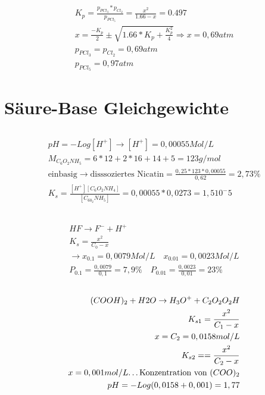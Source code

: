 \documentclass[a4paper]{article}
\begin{document}
\subsection{}
\begin{align}
  K_p = \frac{p_{PCl_3}*p_{Cl_2}}{p_{PCl_5}}=\frac{x^2}{1.66-x}=0.497\\
  x=\frac{-K_p}{2} \pm \sqrt{1.66*K_p+\frac{K_p^2}{4}} \Rightarrow x=0,69 atm\\
  p_{PCl_3} = p_{Cl_2}=0,69 atm\\
  p_{PCl_5} = 0,97 atm
\end{align}

\section{Säure-Base Gleichgewichte}

\subsection{}
\begin{align}
  pH = - Log [H^+] \rightarrow [H^+]=0,00055Mol/L\\
  M_{C_6O_2NH_5}=6*12+2*16+14+5=123g/mol\\
  \text{einbasig} \rightarrow \text{disssoziertes Nicatin}=\frac{0,25*123*0,00055}{0,62}=2,73\%\\
  K_s = \frac{[H^+][C_6O_2NH_4]}{[C_60_2NH_5]}=0,00055*0,0273=1,5 10^-5
\end{align}

\subsection{}
\begin{align}
  HF \rightarrow F^- + H^+\\
  K_s = \frac{x^2}{C_0 - x}\\
  \rightarrow x_{0.1} = 0,0079Mol/L \quad x_{0.01}=0,0023Mol/L\\
  P_{0.1}=\frac{0,0079}{0,1}=7,9\% \quad P_{0.01}=\frac{0,0023}{0,01}=23\%
\end{align}

\subsection{}
\begin{align}
  (COOH)_2 + H2O \rightarrow H_3O^+ + C_2O_2O_2H\\
  K_{s1} = \frac{x^2}{C_1 - x}\\
  x = C_2= 0,0158 mol/L\\
  K_{s2}= = \frac{x^2}{C_2 - x}\\
  x = 0,001 mol/L  \text{\dots Konzentration von $(COO)_2$}\\
  pH=-Log(0,0158+0,001)=1,77
\end{align}
\end{document}
